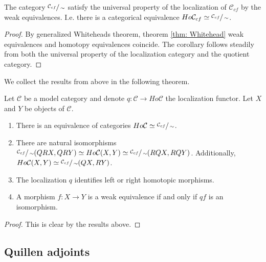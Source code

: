 \documentclass[../thesis.tex]{subfiles}
\begin{document}
            \begin{corollary}
                The category $\sfrac{\mathcal{C}_{cf}}{\sim}$ satisfy the universal property of the localization of $\mathcal{C}_{cf}$ by the weak equivalences. I.e. there is a categorical equivalence $Ho\mathcal{C}_{cf} \simeq \sfrac{\mathcal{C}_{cf}}{\sim}$.
            \end{corollary}

            \begin{proof}
                By generalized Whiteheads theorem, theorem \ref{thm: Whitehead} weak equivalences and homotopy equivalences coincide. The corollary follows steadily from both the universal property of the localization category and the quotient category. 
            \end{proof}

            We collect the results from above in the following theorem.

            \begin{thm}\label{thm: Fundamental-thm-model}
                Let $\mathcal{C}$ be a model category and denote $q: \mathcal{C} \rightarrow Ho\mathcal{C}$ the localization functor. Let $X$ and $Y$ be objects of $\mathcal{C}$.
                \begin{enumerate}
                    \item There is an equivalence of categories $Ho\mathcal{C}\simeq \sfrac{\mathcal{C}_{cf}}{\sim}$.
                    \item There are natural isomorphisms $\sfrac{\mathcal{C}_{cf}}{\sim}(QRX,QRY)\simeq Ho\mathcal{C}(X, Y) \simeq \sfrac{\mathcal{C}_{cf}}{\sim}(RQX, RQY)$. Additionally, $Ho\mathcal{C}(X, Y)\simeq \sfrac{\mathcal{C}_{cf}}{\sim}(QX, RY)$.
                    \item The localization $q$ identifies left or right homotopic morphisms.
                    \item A morphism $f: X \rightarrow Y$ is a weak equivalence if and only if $qf$ is an isomorphism.
                \end{enumerate}
            \end{thm}

            \begin{proof}
                This is clear by the results above.
            \end{proof}

        \subsection{Quillen adjoints}
\end{document}
